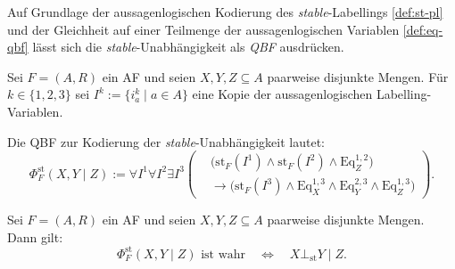 Auf Grundlage der aussagenlogischen Kodierung des \textit{stable}-Labellings
\ref{def:st-pl} und der Gleichheit auf einer Teilmenge der aussagenlogischen Variablen \ref{def:eq-qbf} 
lässt sich die \textit{stable}-Unabhängigkeit als \textit{QBF} ausdrücken.

\begin{Definition}
    \label{def:st-ind-qbf}
    Sei \(F=(A,R)\) ein AF und seien
    \(X,Y,Z\subseteq A\) paarweise disjunkte Mengen. Für
    \(k\in\{1,2,3\}\) sei
    \( I^k := \{i_a^k \mid a\in A\}\)
    eine Kopie der aussagenlogischen Labelling-Variablen.

    Die QBF zur Kodierung der \textit{stable}-Unabhängigkeit lautet:
    \[
    \Phi^{\mathrm{st}}_F(X,Y\mid Z)
    :=
    \forall I^1 \forall I^2 \exists I^3
    \left(
    \begin{aligned}
        &
        \bigl(
            \mathrm{st}_F(I^1)
            \land
            \mathrm{st}_F(I^2)
            \land
            \mathrm{Eq}^{1,2}_Z
        \bigr)
        \\
        &\rightarrow
        \bigl(
            \mathrm{st}_F(I^3)
            \land
            \mathrm{Eq}^{1,3}_X
            \land
            \mathrm{Eq}^{2,3}_Y
            \land
            \mathrm{Eq}^{1,3}_Z
        \bigr)
    \end{aligned}
    \right).
    \]
\end{Definition}

\begin{Proposition}
    \label{prop:st-ind-qbf-correct}
    Sei \(F=(A,R)\) ein AF und seien
    \(X,Y,Z\subseteq A\) paarweise disjunkte Mengen. Dann gilt:
    \[
        \Phi^{\mathrm{st}}_F(X,Y\mid Z)\text{ ist wahr}
        \quad\Longleftrightarrow\quad
        X\bot_{\mathrm{st}}Y\mid Z.
    \]
\end{Proposition}

